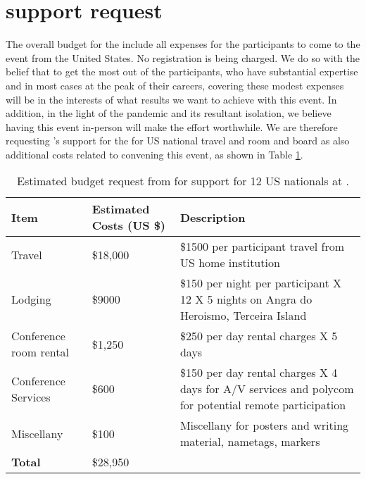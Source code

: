 \section{\nsf support request}

The overall budget for the \symp include all expenses for the
participants to come to the event from the United States. No
registration is being charged. We do so with the belief that to get
the most out of the participants, who have substantial expertise and
in most cases at the peak of their careers, covering these modest
expenses will be in the interests of what results we want to achieve
with this event. In addition, in the light of the pandemic and its
resultant isolation, we believe having this event in-person will make
the effort worthwhile.  We are therefore requesting \nsfe's support
for the \symp for US national travel and room and board as also
additional costs related to convening this event, as shown in Table
\ref{tab:nsf-budget}.

\begin{table}[!h]
  \footnotesize{
    \centering    
    \begin{tabular}{|p{3.0cm}|p{1.6cm}|p{10cm}|}
      \hline 
      \rowcolor{Gray}
      \bfseries Item& \bfseries Estimated Costs (US \$)&\bfseries Description\\
      \hline
      Travel & \$18,000 & \$1500 per participant travel from US home institution \\
      \hline
      Lodging& \$9000 & \$150 per night per participant X 12 X 5 nights on Angra do Heroismo, Terceira Island\\
      \hline
      Conference room rental &\$1,250 & \$250 per day rental charges X
                                        5 days\\
      \hline
      Conference Services& \$600 &  \$150 per day rental charges X 4
                                   days for A/V services and
                                   polycom for potential remote
                                   participation\\
      \hline
      Miscellany& \$100 & Miscellany for posters and writing material,
                          nametags, markers\\
      \hline
      \textbf{Total}& \$28,950&\\
      \hline        
  \end{tabular}
  \caption{Estimated budget request from \nsf for support for 12 US
    nationals at \sympe.}
  \label{tab:nsf-budget}
}
\end{table}

